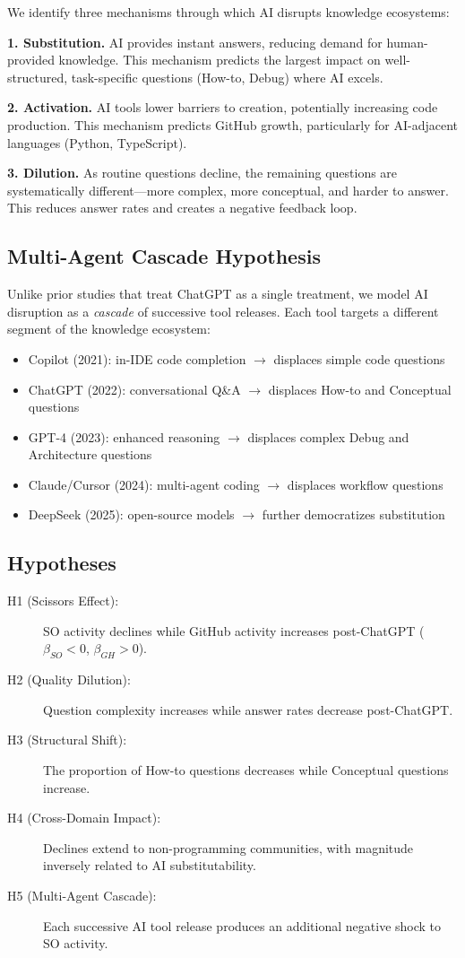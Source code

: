 \documentclass[11pt,a4paper]{article}
\begin{document}
We identify three mechanisms through which AI disrupts knowledge ecosystems:

\textbf{1. Substitution.} AI provides instant answers, reducing demand for human-provided knowledge. This mechanism predicts the largest impact on well-structured, task-specific questions (How-to, Debug) where AI excels.

\textbf{2. Activation.} AI tools lower barriers to creation, potentially increasing code production. This mechanism predicts GitHub growth, particularly for AI-adjacent languages (Python, TypeScript).

\textbf{3. Dilution.} As routine questions decline, the remaining questions are systematically different---more complex, more conceptual, and harder to answer. This reduces answer rates and creates a negative feedback loop.

\subsection{Multi-Agent Cascade Hypothesis}

Unlike prior studies that treat ChatGPT as a single treatment, we model AI disruption as a \textit{cascade} of successive tool releases. Each tool targets a different segment of the knowledge ecosystem:
\begin{itemize}
\item Copilot (2021): in-IDE code completion $\rightarrow$ displaces simple code questions
\item ChatGPT (2022): conversational Q\&A $\rightarrow$ displaces How-to and Conceptual questions
\item GPT-4 (2023): enhanced reasoning $\rightarrow$ displaces complex Debug and Architecture questions
\item Claude/Cursor (2024): multi-agent coding $\rightarrow$ displaces workflow questions
\item DeepSeek (2025): open-source models $\rightarrow$ further democratizes substitution
\end{itemize}

\subsection{Hypotheses}

\begin{description}
\item[H1 (Scissors Effect):] SO activity declines while GitHub activity increases post-ChatGPT ($\beta_{SO} < 0$, $\beta_{GH} > 0$).
\item[H2 (Quality Dilution):] Question complexity increases while answer rates decrease post-ChatGPT.
\item[H3 (Structural Shift):] The proportion of How-to questions decreases while Conceptual questions increase.
\item[H4 (Cross-Domain Impact):] Declines extend to non-programming communities, with magnitude inversely related to AI substitutability.
\item[H5 (Multi-Agent Cascade):] Each successive AI tool release produces an additional negative shock to SO activity.
\end{description}
\end{document}
